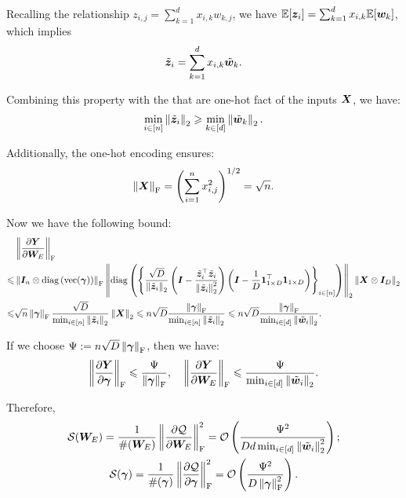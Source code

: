 Recalling the relationship $z_{i,j}=\sum_{k=1}^d x_{i,k} w_{k,j}$, we have $\mathbb{E}[\boldsymbol{z}_i]=\sum_{k=1}^d x_{i,k}\mathbb{E}[\boldsymbol{w}_k]$, which implies
\begin{align*}
    \tilde{\boldsymbol{z}}_i=\sum_{k=1}^d x_{i,k} \tilde{\boldsymbol{w}}_k.
\end{align*}

Combining this property with the that are one-hot fact of the inputs $\boldsymbol{X}$, we have:
\begin{align*}
    \min_{i\in[n]}\left\| \tilde{\boldsymbol{z}}_{i} \right\|_2\geqslant \min_{k\in[d]}\left\| \tilde{\boldsymbol{w}}_{k} \right\|_2.
\end{align*}

Additionally, the one-hot encoding ensures:
\begin{align*}
    \left\| \boldsymbol{X} \right\|_{\textnormal{F}}=\left(\sum_{i=1}^n x_{i,j}^2\right)^{1/2}=\sqrt{n}.
\end{align*}

Now we have the following bound:
\begin{align*}
    &\left\| \frac{\partial\boldsymbol{Y}}{\partial\boldsymbol{W}_E} \right\|_{\textnormal{F}}
    \\\leqslant&\left\| \boldsymbol{I}_n\otimes{\rm diag}\left({\rm vec}(\bm{\gamma})\right) \right\|_{\textnormal{F}}\left\| {\rm diag}\left(\left\{\frac{\sqrt{D}}{\left\| \tilde{\boldsymbol{z}}_{i} \right\|_2}\left(\boldsymbol{I}-\frac{\tilde{\boldsymbol{z}}_{i}^\top\tilde{\boldsymbol{z}}_{i}}{\left\| \tilde{\boldsymbol{z}}_{i} \right\|_2^2}\right)\left(\boldsymbol{I}-\frac{1}{D}\mathbf{1}_{1\times D}^\top\mathbf{1}_{1\times D}\right)\right\}_{i\in[n]}\right) \right\|_2\left\| \boldsymbol{X}\otimes\boldsymbol{I}_D \right\|_2
    \\\leqslant& \sqrt{n}\left\| \bm{\gamma} \right\|_{\textnormal{F}}\frac{\sqrt{D}}{\min_{i\in[n]}\left\| \tilde{\boldsymbol{z}}_i \right\|_2}\left\| \boldsymbol{X} \right\|_2\leqslant n\sqrt{D}\frac{\left\| \bm{\gamma} \right\|_{\textnormal{F}}}{\min_{i\in[n]}\left\| \tilde{\boldsymbol{z}}_i \right\|_2}
    \leqslant n\sqrt{D}\frac{\left\| \bm{\gamma} \right\|_{\textnormal{F}}}{\min_{i\in[d]}\left\| \tilde{\boldsymbol{w}}_i \right\|_2}.
\end{align*}

If we choose $\Psi:=n\sqrt{D}\left\| \bm{\gamma} \right\|_{\textnormal{F}} $, then we have:
\begin{align*}
    \left\| \frac{\partial\boldsymbol{Y}}{\partial\bm{\gamma}} \right\|_{\textnormal{F}}\leqslant\frac{\Psi}{\left\| \bm{\gamma} \right\|_{\textnormal{F}}}
    ,\quad
    \left\| \frac{\partial\boldsymbol{Y}}{\partial\boldsymbol{W}_E} \right\|_{\textnormal{F}}\leqslant\frac{\Psi}{\min_{i\in[d]}\left\| \tilde{\boldsymbol{w}}_i \right\|_2}.
\end{align*}


Therefore,
\begin{gather*}
    \mathcal{S}(\boldsymbol{W}_E)=\frac{1}{\#(\boldsymbol{W}_E)}\left\| \frac{\partial \mathcal{Q}}{\partial\boldsymbol{W}_E} \right\|_{\textnormal{F}}^2=\mathcal{O}\left(\frac{\Psi^2}{Dd\min_{i\in[d]}\left\| \tilde{\boldsymbol{w}}_i \right\|_2^2}\right);
    \\
    \mathcal{S}(\bm{\gamma})=\frac{1}{\#(\bm{\gamma})}\left\| \frac{\partial \mathcal{Q}}{\partial\bm{\gamma}} \right\|_{\textnormal{F}}^2=\mathcal{O}\left(\frac{\Psi^2}{D\left\| \bm{\gamma} \right\|_{\textnormal{F}}^2}\right).
\end{gather*}





